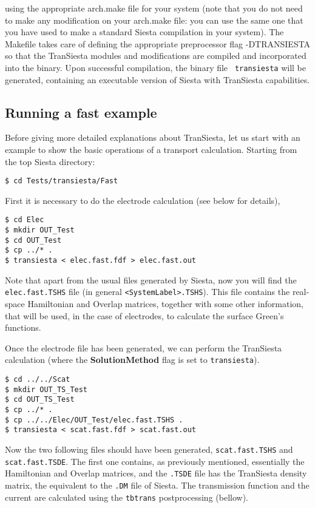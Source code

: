 \documentclass[11pt]{article}
\begin{document}
using the appropriate arch.make file for your system (note that you do
not need to make any modification on your arch.make file: you can use
the same one that you have used to make a standard {\sc Siesta}
compilation in your system).  The Makefile takes care of defining the
appropriate preprocessor flag -DTRANSIESTA so that the {\sc
  TranSiesta} modules and modifications are compiled and incorporated
into the binary. Upon successful compilation, the binary file {\tt
  transiesta} will be generated, containing an executable version of
{\sc Siesta} with {\sc TranSiesta} capabilities.

\subsection{Running a fast example}

Before giving more detailed explanations about {\sc TranSiesta}, let
us start with an example to show the basic operations of a transport
calculation.  Starting from the top {\sc Siesta} directory:

\begin{verbatim}
$ cd Tests/transiesta/Fast
\end{verbatim}

First it is necessary to do the electrode calculation (see below for
details),

\begin{verbatim}
$ cd Elec
$ mkdir OUT_Test
$ cd OUT_Test
$ cp ../* .
$ transiesta < elec.fast.fdf > elec.fast.out
\end{verbatim}

Note that apart from the usual files generated by {\sc Siesta}, now you will 
find the {\tt elec.fast.TSHS} file (in general {\tt <SystemLabel>.TSHS}). 
This file contains the real-space Hamiltonian and Overlap matrices, together 
with some other information, that will be used, in the case of electrodes, to 
calculate the surface Green's functions. 

Once the electrode file has been generated, we can perform the {\sc
  TranSiesta} calculation (where the {\bf SolutionMethod} flag is set
to {\tt transiesta}).

\begin{verbatim}
$ cd ../../Scat
$ mkdir OUT_TS_Test
$ cd OUT_TS_Test
$ cp ../* .
$ cp ../../Elec/OUT_Test/elec.fast.TSHS .
$ transiesta < scat.fast.fdf > scat.fast.out
\end{verbatim}

Now the two following files should have been generated, {\tt scat.fast.TSHS} 
and {\tt scat.fast.TSDE}. The first one contains, as previously mentioned, 
essentially the Hamiltonian and Overlap matrices, and the {\tt .TSDE} file 
has the {\sc TranSiesta} density matrix, the equivalent to the {\tt .DM} 
file of {\sc Siesta}. The transmission function and the current are calculated 
using the {\tt tbtrans} postprocessing (bellow).
\end{document}
